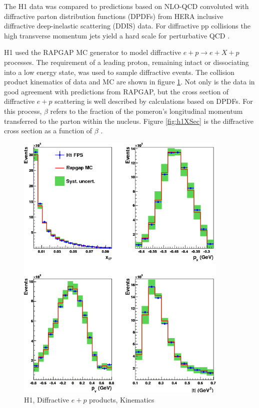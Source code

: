 The H1 data was compared to predictions based on NLO-QCD convoluted with diffractive parton distribution functions (DPDFs) from HERA inclusive diffractive deep-inelastic scattering (DDIS) data. For diffractive pp collisions the high transverse momentum jets yield a hard scale for perturbative QCD \cite{Aaron:2010su}.

H1 used the RAPGAP MC generator to model diffractive $e+p \rightarrow e+X+p$ processes. The requirement of a leading proton, remaining intact or dissociating into a low energy state, was used to sample diffractive events. The collision product kinematics of data and MC are shown in figure \ref{fig:h1Kinematics}. Not only is the data in good agreement with predictions from RAPGAP, but the cross section of diffractive $e+p$ scattering is well described by calculations based on DPDFs. For this process, $\beta$ refers to the fraction of the pomeron's longitudinal momentum transferred to the parton within the nucleus. Figure \ref{fig:h1XSec} is the diffractive cross section as a function of $\beta$ \cite{Aaron:2010aa}. 

\begin{figure}[h!]
\begin{centering}
\includegraphics[width=4in]{Chapter2/importfigs/d10-095f3.png}
\par\end{centering}
\caption{H1, Diffractive $e+p$ products, Kinematics \cite{Aaron:2010aa} \label{fig:h1Kinematics}}
\end{figure}
 
